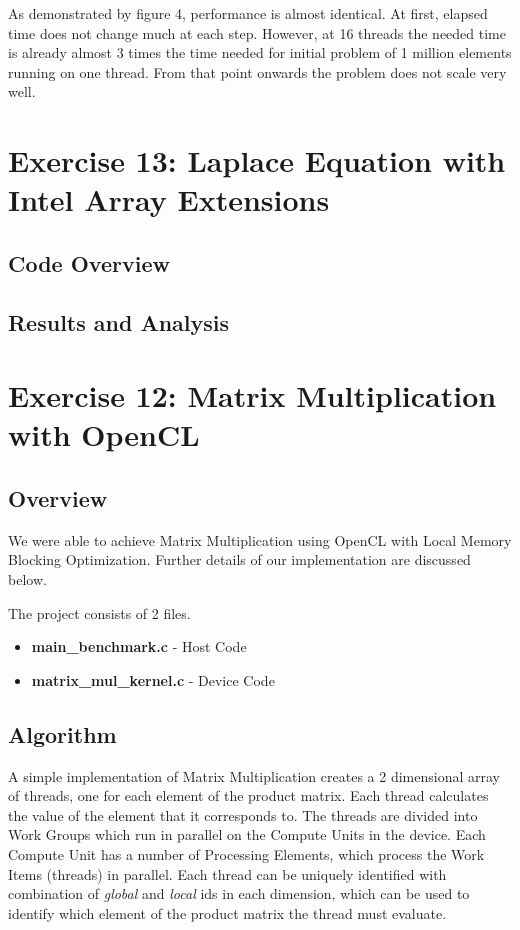 \documentclass[]{scrartcl}
\begin{document}
As demonstrated by figure 4, performance is almost identical. At first, elapsed time does not change much at each step. However, at 16 threads the needed time is already almost 3 times the time needed for initial problem of 1 million elements running on one thread. From that point onwards the problem does not scale very well.

\pagebreak
\section{Exercise 13: Laplace Equation with Intel Array Extensions}

\subsection{Code Overview}

\subsection{Results and Analysis}

\pagebreak
\section{Exercise 12: Matrix Multiplication with OpenCL}

\subsection{Overview}
We were able to achieve Matrix Multiplication using OpenCL with Local Memory Blocking Optimization.
Further details of our implementation are discussed below.

The project consists of 2 files.
\begin{itemize}
	\item \textbf{main\_benchmark.c} - Host Code
	\item \textbf{matrix\_mul\_kernel.c} - Device Code
\end{itemize}

\subsection{Algorithm}
A simple implementation of Matrix Multiplication creates a 2 dimensional array of threads, one for
each element of the product matrix. Each thread calculates the value of the element that it corresponds to. The threads are divided into Work Groups which run in parallel on the Compute Units
in the device. Each Compute Unit has a number of Processing Elements, which process the Work Items
(threads) in parallel. Each thread can be uniquely identified with combination of \textit{global} and \textit{local} ids in each dimension, which can be used to identify which element of the product
matrix the thread must evaluate.
\end{document}
